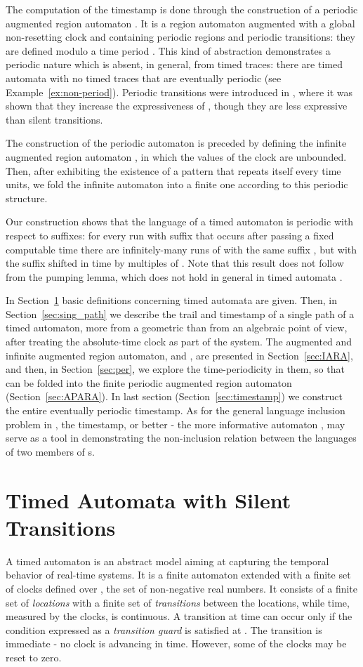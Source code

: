 \documentclass[11pt]{amsart}
\theoremstyle{definition}
\begin{document}
The computation of the timestamp is done through the construction of a periodic augmented region automaton .
It is a region automaton augmented with a global non-resetting clock  and containing periodic regions and periodic transitions: they are defined modulo a time period .
This kind of abstraction demonstrates a periodic nature which is absent, in general, from timed traces: there are timed automata with no timed traces that are eventually periodic (see Example~\ref{ex:non-period}).
Periodic transitions were introduced in \cite{periodic}, where it was shown that they increase the expressiveness of , though they are less expressive than silent transitions.

The construction of the periodic automaton is preceded by defining the infinite augmented region automaton , in which the values of the clock  are unbounded.
Then, after exhibiting the existence of a pattern that repeats itself every  time units, we fold the infinite automaton into a finite one according to this periodic structure.

Our construction shows that the language of a timed automaton  is periodic with respect to suffixes: for every run  with suffix  that occurs after passing a fixed computable time there are infinitely-many runs of  with the same suffix , but with the suffix shifted in time by multiples of .
Note that this result does not follow from the pumping lemma, which does not hold in general in timed automata \cite{pumping}. 

In Section~\ref{sec:ta} basic definitions concerning timed automata are given.
Then, in Section~\ref{sec:sing_path} we describe the trail and timestamp of a single path of a timed automaton, more from a geometric than from an algebraic point of view, after treating the absolute-time clock  as part of the system.
The augmented and infinite augmented region automaton,  and , are presented in Section~\ref{sec:IARA}, and then, in Section~\ref{sec:per}, we explore the time-periodicity in them, so that  can be folded into the finite periodic augmented region automaton  (Section~\ref{sec:APARA}).
In last section (Section~\ref{sec:timestamp}) we construct the entire eventually periodic timestamp.
As for the general language inclusion problem in , the timestamp, or better - the more informative automaton , may serve as a tool in demonstrating the non-inclusion relation between the languages of two members of s.
\section{Timed Automata with Silent Transitions}
\label{sec:ta}
A timed automaton is an abstract model aiming at capturing the temporal behavior of real-time systems.
It is a finite automaton extended with a finite set of clocks defined over , the set of non-negative real numbers.
It consists of a finite set of \emph{locations}  with a finite set of \emph{transitions}  between the locations, while time, measured by the clocks, is continuous.
A transition at time  can occur only if the condition expressed as a \emph{transition guard}
is satisfied at .
The transition is immediate - no clock is advancing in time. However, some of the clocks may be reset to zero.
\end{document}
